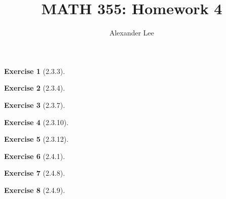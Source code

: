 \documentclass{amsart}
\title{MATH 355: Homework 4}
\author{Alexander Lee}
\theoremstyle{definition}
\newtheorem{exercise}{Exercise}
\begin{document}
\maketitle

\begin{exercise}[2.3.3]
\end{exercise}

\begin{exercise}[2.3.4]
\end{exercise}

\begin{exercise}[2.3.7]
\end{exercise}

\begin{exercise}[2.3.10]
\end{exercise}

\begin{exercise}[2.3.12]
\end{exercise}

\begin{exercise}[2.4.1]
\end{exercise}

\begin{exercise}[2.4.8]
\end{exercise}

\begin{exercise}[2.4.9]
\end{exercise}
\end{document}
